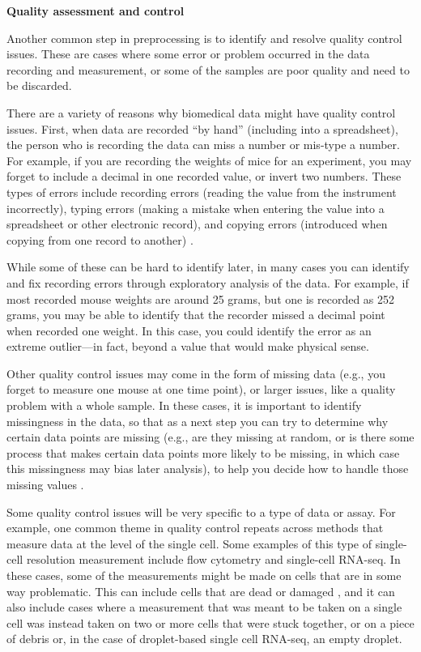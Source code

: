 \documentclass[]{tufte-book}
\begin{document}
\textbf{Quality assessment and control}

Another common step in preprocessing is to identify and resolve quality control
issues. These are cases where some error or problem occurred in the data
recording and measurement, or some of the samples are poor quality and need to
be discarded.

There are a variety of reasons why biomedical data might have quality control
issues. First, when data are recorded ``by hand'' (including into a spreadsheet),
the person who is recording the data can miss a number or mis-type a number. For
example, if you are recording the weights of mice for an experiment, you may
forget to include a decimal in one recorded value, or invert two numbers. These
types of errors include recording errors (reading the value from the instrument
incorrectly), typing errors (making a mistake when entering the value into a
spreadsheet or other electronic record), and copying errors (introduced when
copying from one record to another) \citep{chatfield1995problem}.

While some of these can be hard to identify later, in many cases you can
identify and fix recording errors through exploratory analysis of the data. For
example, if most recorded mouse weights are around 25 grams, but one is recorded
as 252 grams, you may be able to identify that the recorder missed a decimal point
when recorded one weight. In this case, you could identify the error as
an extreme outlier---in fact, beyond a value that would make physical sense.

Other quality control issues may come in the form of missing data (e.g., you
forget to measure one mouse at one time point), or larger issues, like a quality
problem with a whole sample. In these cases, it is important to
identify missingness in the data, so that as a next step you can try to
determine why certain data points are missing (e.g., are they missing at random,
or is there some process that makes certain data points more likely to be
missing, in which case this missingness may bias later analysis), to help you
decide how to handle those missing values \citep{chatfield1995problem}.

Some quality control issues will be very specific to a type of data or assay.
For example, one common theme in quality control repeats across methods
that measure data at the level of the single cell. Some examples of this type of
single-cell resolution measurement include flow cytometry and single-cell
RNA-seq. In these cases, some of the measurements might be made on cells that
are in some way problematic. This can include cells that are dead or damaged
\citep{ilicic2016classification}, and it can also include cases where a measurement
that was meant to be taken on a single cell was instead taken on two or more
cells that were stuck together, or on a piece of debris or, in the case of
droplet-based single cell RNA-seq, an empty droplet.
\end{document}
